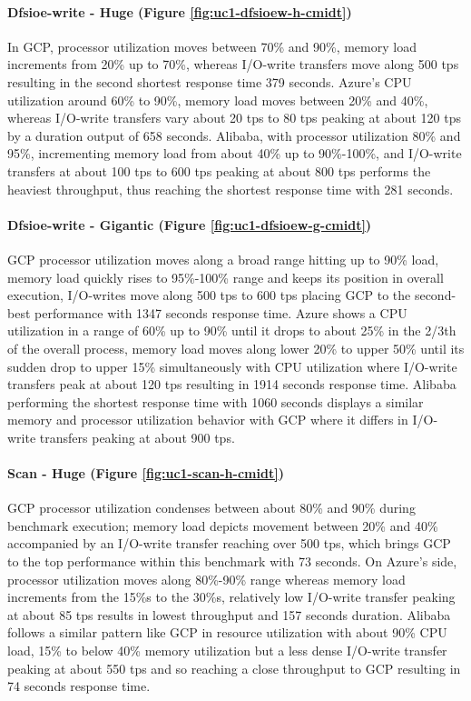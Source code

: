 \documentclass[review]{elsarticle}
\begin{document}
\paragraph{Dfsioe-write - Huge (Figure \ref{fig:uc1-dfsioew-h-cmidt})}In GCP, processor utilization moves between 70\% and 90\%, memory load increments from 20\% up to 70\%, whereas I/O-write transfers move along 500 tps resulting in the second shortest response time 379 seconds. Azure's CPU utilization around 60\% to 90\%, memory load moves between 20\% and 40\%, whereas I/O-write transfers vary about 20 tps to 80 tps peaking at about 120 tps by a duration output of 658 seconds. Alibaba, with processor utilization 80\% and 95\%, incrementing memory load from about 40\% up to 90\%-100\%, and I/O-write transfers at about 100 tps to 600 tps peaking at about 800 tps performs the heaviest throughput, thus reaching the shortest response time with 281 seconds.

\paragraph{Dfsioe-write - Gigantic (Figure \ref{fig:uc1-dfsioew-g-cmidt})}GCP processor utilization moves along a broad range hitting up to 90\% load, memory load quickly rises to 95\%-100\% range and keeps its position in overall execution, I/O-writes move along 500 tps to 600 tps placing GCP to the second-best performance with 1347 seconds response time. Azure shows a CPU utilization in a range of 60\% up to 90\% until it drops to about 25\% in the 2/3th of the overall process, memory load moves along lower 20\% to upper 50\% until its sudden drop to upper 15\% simultaneously with CPU utilization where I/O-write transfers peak at about 120 tps resulting in 1914 seconds response time. Alibaba performing the shortest response time with 1060 seconds displays a similar memory and processor utilization behavior with GCP where it differs in I/O-write transfers peaking at about 900 tps.

\paragraph{Scan - Huge (Figure \ref{fig:uc1-scan-h-cmidt})}GCP processor utilization condenses between about 80\% and 90\% during benchmark execution; memory load depicts movement between 20\% and 40\% accompanied by an I/O-write transfer reaching over 500 tps, which brings GCP to the top performance within this benchmark with 73 seconds. On Azure's side, processor utilization moves along 80\%-90\% range whereas memory load increments from the 15\%s to the 30\%s, relatively low I/O-write transfer peaking at about 85 tps results in lowest throughput and 157 seconds duration. Alibaba follows a similar pattern like GCP in resource utilization with about 90\% CPU load, 15\% to below 40\% memory utilization but a less dense I/O-write transfer peaking at about 550 tps and so reaching a close throughput to GCP resulting in 74 seconds response time.
\end{document}
